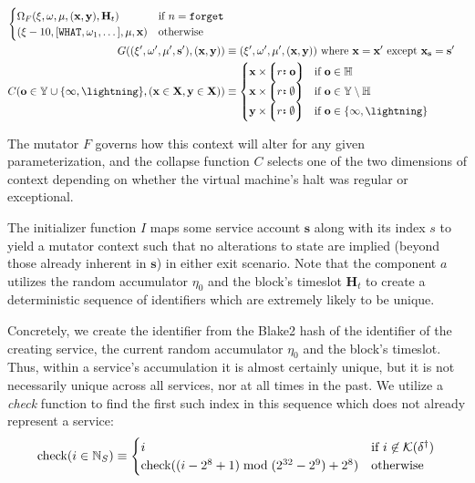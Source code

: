 \begin{align}
\begin{cases}
    \Omega_F(\xi, \omega, \mu, (\mathbf{x}, \mathbf{y}), \mathbf{H}_t) &\when n = \mathtt{forget} \\
    (\xi - 10, [\mathtt{WHAT}, \omega_1, \dots], \mu, \mathbf{x}) &\otherwise
  \end{cases} \\
  G((\xi', \omega', \mu', \mathbf{s}'), (\mathbf{x}, \mathbf{y})) &\equiv (\xi', \omega', \mu', (\mathbf{x}, \mathbf{y}))\ \where \mathbf{x} = \mathbf{x}' \exc \mathbf{x}_\mathbf{s} = \mathbf{s}' \\
  C(\mathbf{o} \in \mathbb{Y} \cup \{\oog, \panic\}, (\mathbf{x}\in\mathbf{X}, \mathbf{y}\in\mathbf{X})) &\equiv \begin{cases}
    \mathbf{x} \times \tup{\is{r}{\mathbf{o}}} & \when \mathbf{o} \in \mathbb{H} \\
    \mathbf{x} \times \tup{\is{r}{\none}} & \when \mathbf{o} \in \mathbb{Y} \setminus \H \\
    \mathbf{y} \times \tup{\is{r}{\none}} & \when \mathbf{o} \in \{\oog, \panic\} \\
  \end{cases}
\end{align}

The mutator $F$ governs how this context will alter for any given parameterization, and the collapse function $C$ selects one of the two dimensions of context depending on whether the virtual machine's halt was regular or exceptional.

The initializer function $I$ maps some service account $\mathbf{s}$ along with its index $s$ to yield a mutator context such that no alterations to state are implied (beyond those already inherent in $\mathbf{s}$) in either exit scenario. Note that the component $a$ utilizes the random accumulator $\eta_0$ and the block's timeslot $\mathbf{H}_t$ to create a deterministic sequence of identifiers which are extremely likely to be unique.

Concretely, we create the identifier from the Blake2 hash of the identifier of the creating service, the current random accumulator $\eta_0$ and the block's timeslot. Thus, within a service's accumulation it is almost certainly unique, but it is not necessarily unique across all services, nor at all times in the past. We utilize a \emph{check} function to find the first such index in this sequence which does not already represent a service:
\begin{equation}
  \text{check}(i \in \mathbb{N}_S) \equiv \begin{cases}
    i &\text{if } i \not\in \mathcal{K}(\delta^\dagger)\\
    \text{check}((i - 2^8 + 1) \bmod (2^{32}-2^9) + 2^8)&\text{otherwise}
  \end{cases}
\end{equation}

